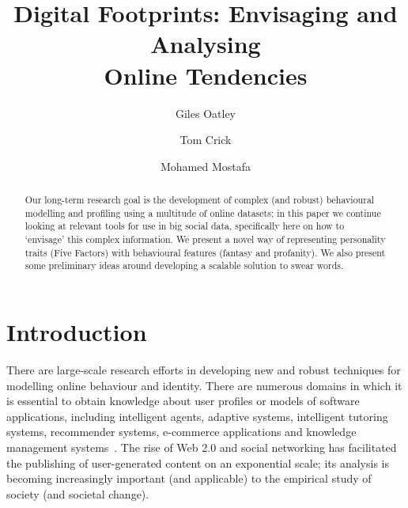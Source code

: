 \documentclass{AISB2008}
\begin{document}
\title{Digital Footprints: Envisaging  and Analysing\\Online Tendencies}

\author{Giles Oatley \and Tom Crick \and Mohamed
  Mostafa }

\maketitle


\begin{abstract}
Our long-term research goal is the development of complex (and robust)
behavioural modelling and profiling using a multitude of online
datasets; in this paper we continue looking at relevant tools for use
in big social data, specifically here on how to `envisage' this
complex information. We present a novel way of representing
personality traits (Five Factors) with behavioural features (fantasy
and profanity).  We also present some preliminary ideas around
developing a scalable solution to swear words.
\end{abstract}


\section{Introduction}

There are large-scale research efforts in developing new and robust
techniques for modelling online behaviour and identity. There are
numerous domains in which it is essential to obtain knowledge about
user profiles or models of software applications, including
intelligent agents, adaptive systems, intelligent tutoring systems,
recommender systems, e-commerce applications and knowledge management
systems~\cite{schiaffino+amandi:2009}. The rise of Web 2.0 and social
networking has facilitated the publishing of user-generated content on
an exponential scale; its analysis is becoming increasingly important
(and applicable) to the empirical study of society (and societal
change).
\end{document}
